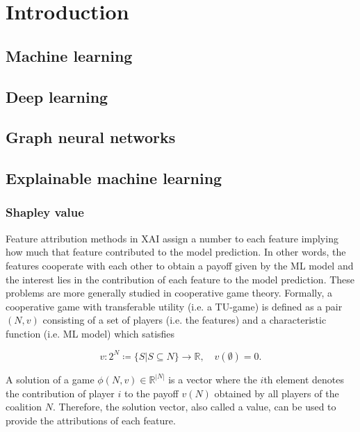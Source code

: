 \chapter{Introduction}


\section{Machine learning}

\section{Deep learning}


\section{Graph neural networks}


\section{Explainable machine learning}

\subsection{Shapley value}

Feature attribution methods in XAI assign a number to each feature implying how
much that feature contributed to the model prediction.\cite{merrick2020explanation}
In other words, the features cooperate with each other to obtain a payoff given
by the ML model and the interest lies in the contribution of each feature to the
model prediction. These problems are more generally studied in cooperative game
theory. Formally, a cooperative game with transferable utility (i.e. a TU-game) is
defined as a pair $(N, v)$ consisting of a set of players (i.e. the features)
and a characteristic function (i.e. ML model) which satisfies\cite{zhang2022gstarx}


\begin{equation}
	v: 2^N \coloneqq \{S | S \subseteq N\} \rightarrow \mathbb{R}, \quad v\left(\emptyset\right) = 0.
\end{equation}


A solution of a game $\phi(N, v) \in \mathbb{R}^{|N|}$ is a vector where the $i$th element
denotes the contribution of player $i$ to the payoff $v(N)$ obtained by all players
of the coalition $N$.\cite{zhang2022gstarx} Therefore, the solution vector,
also called a value, can be used to provide the attributions of each feature.


